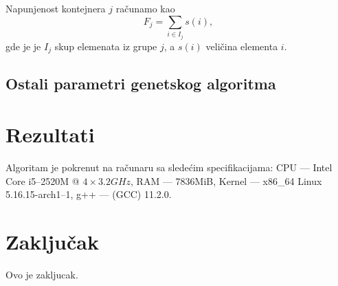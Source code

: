 \documentclass[a4paper,12pt,twocolumn]{article}
\begin{document}
Napunjenost kontejnera $j$ računamo kao 
\begin{equation}
    F_j = \sum_{i \in I_j} s(i),
\end{equation}
gde je je $I_j$ skup elemenata iz grupe $j$, a $s(i)$ veličina elementa $i$.

\subsection{Ostali parametri genetskog algoritma}

\section{Rezultati}

Algoritam je pokrenut na računaru sa sledećim specifikacijama: 
CPU --- Intel Core i5--2520M @ $4 \times 3.2GHz$,
RAM --- 7836MiB,
Kernel --- x86\_64 Linux 5.16.15-arch1--1,
g++ --- (GCC) 11.2.0.


\section{Zaključak}

Ovo je zakljucak.

\nocite{*}

\printbibliography[title={Literatura}]
\end{document}
